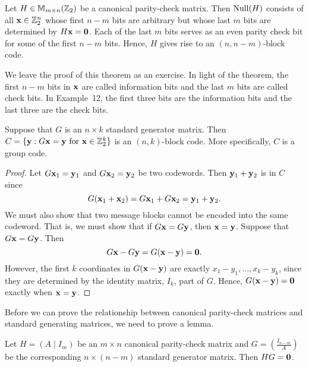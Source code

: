  
\begin{theorem}
Let $H \in {\Bbb M}_{m \times n}({\Bbb Z}_2)$ be a canonical
parity-check matrix. Then ${\rm Null}(H)$ consists of all 
${\bold x} \in {\Bbb
Z}_2^n$ whose first $n-m$ bits are arbitrary but whose last $m$ bits
are determined by $H{\bold x} = {\bold 0}$. Each of
the last $m$ bits serves as an even parity check bit for some of the
first $n-m$ bits. Hence, $H$ gives rise to an $(n, n-m)$-block code. 
\end{theorem}
 
 
We leave the proof of this theorem as an exercise. In light of the
theorem, the first $n-m$ bits in ${\bold x}$ are called {\bfi
information bits\/} and the last $m$ bits are called {\bfi check bits}.
In Example~12, the first three bits are the information bits
and the last three are the check bits.
 
 
\begin{theorem}
Suppose that $G$ is an $n \times k$  standard generator matrix.  Then
\mbox{$C = \{ {\bold y} : G {\bold x} ={\bold y} \mbox{ for ${\bold x} \in
{\Bbb  Z}_2^k$} \}$} is an  $(n,k)$-block code. More specifically, $C$
is a group code.  
\end{theorem}
 
 
\begin{proof}
Let $G {\bold x}_1 = {\bold y}_1$ and $G {\bold
x}_2 ={\bold y}_2$ be two codewords. Then ${\bold y}_1
+ {\bold y}_2$ is in $C$ since 
\[
G( {\bold x}_1 + {\bold x}_2)
=
G {\bold x}_1 + G {\bold x}_2
=
{\bold y}_1 + {\bold y}_2.
\]
We must also show that two message blocks cannot be encoded into the
same codeword. That is, we must show that if $G {\bold x} = G
{\bold y}$, then ${\bold x} = {\bold y}$.  Suppose that $G
{\bold x} = G {\bold y}$. Then
\[
G {\bold x} - G {\bold y}
=
G( {\bold x} - {\bold y})
=
{\bold 0}.
\]
However, the first $k$ coordinates in $G( {\bold x} - {\bold
y})$ are exactly $x_1 -y_1, \ldots, x_k - y_k$, since they are
determined by the identity matrix, $I_k$, part of $G$. Hence, $G(
{\bold x} - {\bold y}) = {\bold 0}$ exactly when
${\bold x} = {\bold y}$.
\end{proof}
 
 
\vspace{2ex}
 
 
Before we can prove the relationship between canonical parity-check
matrices and standard generating matrices, we need to prove a lemma.
 
 
\begin{lemma}
Let $H = (A \mid I_m )$ be an $m \times n$ canonical parity-check
matrix and $G = \left( \frac{I_{n-m} }{A} \right)$ be the
corresponding $n \times (n-m)$ standard generator matrix. Then $HG =
{\bold 0}$. 
\end{lemma}
 
